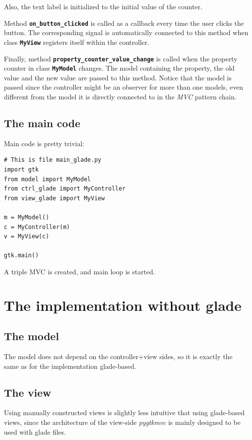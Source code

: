 \documentclass{article}
\newcommand{\kw}[1]{\emph{#1}\xspace}
\newcommand{\mvc}{\kw{MVC} pattern\xspace}
\newcommand{\pygtkmvc}{\kw{pygtkmvc}}
\newcommand{\codename}[1]{\texttt{\bfseries \textcolor {codecolor}{#1}}\xspace}
\newcommand{\codesize}{\small \color{codecolor}}
\begin{document}
Also, the text label is initialized to the initial value of the
counter.

Method \codename{on\_button\_clicked} is called as a callback every
time the user clicks the button. The corresponding signal is
automatically connected to this method when class \codename{MyView}
registers itself within the controller.

Finally, method \codename{property\_counter\_value\_change} is called
when the property counter in class \codename{MyModel} changes. The
model containing the property, the old value and the new value are
passed to this method.  Notice that the model is passed since the
controller might be an observer for more than one models, even
different from the model it is directly connected to in the \mvc
chain.


\subsection{The main code}
Main code is pretty trivial:
  
{ \codesize 
\begin{verbatim}   
# This is file main_glade.py
import gtk
from model import MyModel
from ctrl_glade import MyController
from view_glade import MyView

m = MyModel()
c = MyController(m)
v = MyView(c)

gtk.main()
\end{verbatim}
} 

A triple MVC is created, and main loop is started. 


\section{The implementation without glade}

\subsection{The model}
The model does not depend on the controller+view sides, so it is
exactly the same as for the implementation glade-based.

\subsection{The view}
Using manually constructed views is slightly less intuitive that using
glade-based views, since the architecture of the view-side \pygtkmvc
is mainly designed to be used with glade files.
\end{document}
